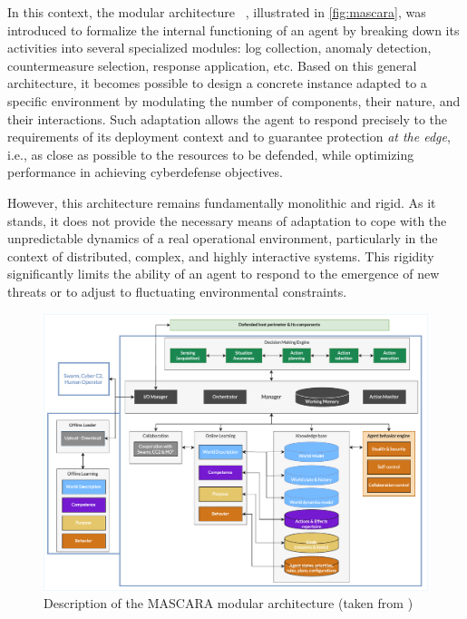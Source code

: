 In this context, the modular architecture ~\cite{Theron2020MASCARA}, illustrated in \autoref{fig:mascara}, was introduced to formalize the internal functioning of an agent  by breaking down its activities into several specialized modules: log collection, anomaly detection, countermeasure selection, response application, etc. Based on this general architecture, it becomes possible to design a concrete instance adapted to a specific environment by modulating the number of components, their nature, and their interactions. Such adaptation allows the  agent to respond precisely to the requirements of its deployment context and to guarantee protection {\em at the edge}, i.e., as close as possible to the resources to be defended, while optimizing performance in achieving cyberdefense objectives.

However, this architecture remains fundamentally monolithic and rigid. As it stands, it does not provide the necessary means of adaptation to cope with the unpredictable dynamics of a real operational environment, particularly in the context of distributed, complex, and highly interactive systems. This rigidity significantly limits the ability of an  agent to respond to the emergence of new threats or to adjust to fluctuating environmental constraints.


\begin{figure}[h!]
  \centering
  \includegraphics[width=\linewidth]{figures/MASCARA.pdf}
  \caption{Description of the MASCARA modular architecture (taken from \autocite{Kott2023})}
  \label{fig:mascara}
\end{figure}

